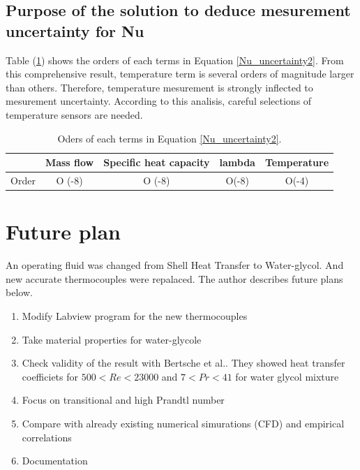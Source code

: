 \documentclass[conference]{IEEEtran}
\begin{document}
\subsection{Purpose of the solution to deduce mesurement uncertainty for Nu}
Table (\ref{order}) shows the orders of each terms in Equation \ref{Nu_uncertainty2}.
From this comprehensive result, temperature term is several orders of magnitude larger than others.
Therefore, temperature mesurement is strongly inflected to mesurement uncertainty.
According to this analisis, careful selections of temperature sensors are needed.
\begin{table}[h]
 \caption{Oders of each terms in Equation \ref{Nu_uncertainty2}.}
 \label{order}
 \centering
 \begin{tabular}{ccccc}
\hline
      & Mass flow & Specific heat capacity & lambda & Temperature \\ \hline
Order & O (-8)    & O (-8)                 & O(-8)  & O(-4)
 \end{tabular}
\end{table}

\section{Future plan}
An operating fluid was changed from Shell Heat Transfer to Water-glycol.
And new accurate thermocouples were repalaced.
The author describes future plans below.
\begin{enumerate}
  \item Modify Labview program for the new thermocouples
  \item Take material properties for water-glycole
  \item Check validity of the result with Bertsche et al.\cite{Bertsche2016}.
  They showed heat transfer coefficiets for $500 < Re < 23000$ and $7 < Pr < 41$ for water glycol mixture
  \item Focus on transitional and high Prandtl number
  \item Compare with already existing numerical simurations (CFD) and empirical correlations
  \item Documentation
\end{enumerate}

\newpage
\end{document}
